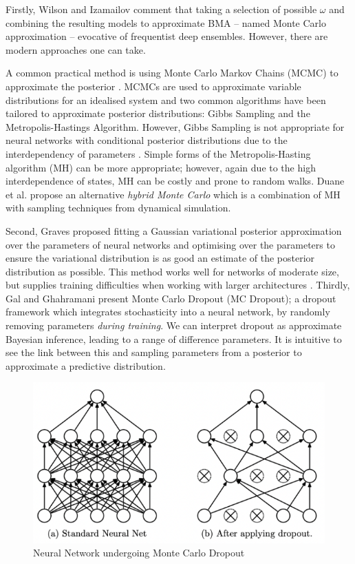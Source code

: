 \documentclass[ %
                    author={James Stephenson},
                supervisor={Dr. Edwin Simpson},
                    degree={MSc},
                     title={Project Plan: Bayesian Deep Learning For Extractive Test Summarisation},
                  subtitle={},
                      type={},
                      year={2022}]{../additions/dissertation}
\begin{document}
			Firstly, Wilson and Izamailov \cite{Izmailov20} comment that taking a selection of possible $\omega$ and combining the resulting models to approximate BMA – named Monte Carlo approximation – evocative of frequentist deep ensembles. However, there are modern approaches one can take.
			
			\medbreak
			A common practical method is using Monte Carlo Markov Chains (MCMC) to approximate the posterior \cite{Izmailov20}. MCMCs are used to approximate variable distributions for an idealised system \cite{Brooks11} and two common algorithms have been tailored to approximate posterior distributions: Gibbs Sampling and the Metropolis-Hastings Algorithm. However, Gibbs Sampling is not appropriate for neural networks with conditional posterior distributions due to the interdependency of parameters \cite{Neal95}. Simple forms of the Metropolis-Hasting algorithm (MH) can be more appropriate; however, again due to the high interdependence of states, MH can be costly and prone to random walks. Duane et al. \cite{Duane87} propose an alternative \emph{hybrid Monte Carlo} which is a combination of MH with sampling techniques from dynamical simulation.
			
			\medbreak
			Second, Graves \cite{Graves11} proposed fitting a Gaussian variational posterior approximation over the parameters of neural networks and optimising over the parameters to ensure the variational distribution is as good an estimate of the posterior distribution as possible. This method works well for networks of moderate size, but supplies training difficulties when working with larger architectures \cite{He15}.
Thirdly, Gal and Ghahramani \cite{Gal15} present Monte Carlo Dropout (MC Dropout); a dropout framework which integrates stochasticity into a neural network, by randomly removing parameters \emph{during training}. We can interpret dropout as approximate Bayesian inference, leading to a range of difference parameters. It is intuitive to see the link between this and sampling parameters from a posterior to approximate a predictive distribution.
		
			\begin{figure}
				\centering
				\includegraphics[width=0.5\linewidth]{../additions/figures/Srivastava14_MCDropout}
				\caption{Neural Network undergoing Monte Carlo Dropout \cite{Srivastava14}}
				\label{fig:MC_dropout}
			\end{figure}
			
\end{document}
